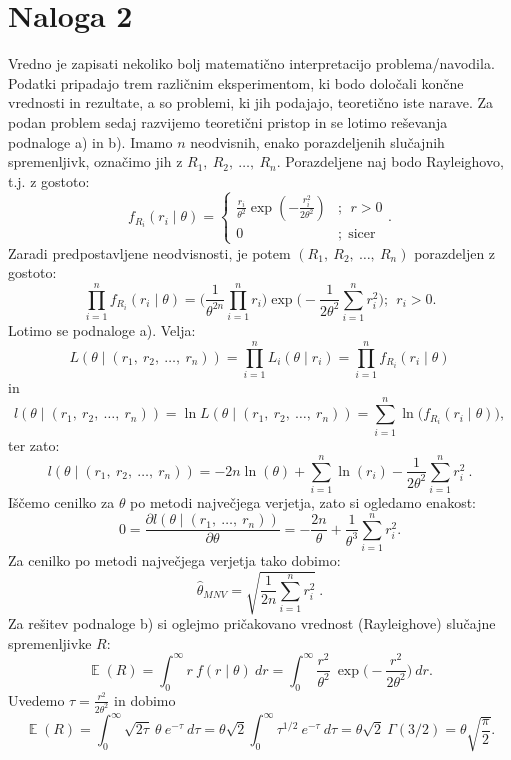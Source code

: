 \documentclass{article}
\DeclareMathOperator{\EX}{\mathbb{E}}
\begin{document}
\section{Naloga 2}
Vredno je zapisati nekoliko bolj matematično interpretacijo problema/navodila. 
Podatki pripadajo trem različnim eksperimentom, ki bodo določali končne vrednosti in rezultate, a so problemi, ki jih podajajo, teoretično iste narave. 
Za podan problem sedaj razvijemo teoretični pristop in se lotimo reševanja podnaloge a) in b). 
\newline
Imamo $n$ neodvisnih, enako porazdeljenih slučajnih spremenljivk, označimo jih z $R_1,~R_2,~\dots,~R_n$. 
Porazdeljene naj bodo Rayleighovo, t.j. z gostoto:
$$
f_{R_i}(r_{i} \mid \theta)=\left\{\begin{array}{cl}
\frac{r_i}{\theta^{2}} \exp \left(-\frac{r_{i}^{2}}{2 \theta^{2}}\right) & ;~~r>0 \\
0 & ;~~\text{sicer }
\end{array}\right. .
$$
Zaradi predpostavljene neodvisnosti, je potem $(R_1,~R_2,~\dots,~R_n)$ porazdeljen z gostoto:
$$
    \prod_{i=1}^{n}{f_{R_i}(r_{i} \mid \theta)} = 
    \bigg(\frac{1}{\theta^{2n}}\prod_{i=1}^{n}{r_i}\bigg) \exp\bigg(-\frac{1}{2 \theta^{2}} \sum_{i=1}^{n}{r_i^2}\bigg);~~r_i>0.
$$
Lotimo se podnaloge a). Velja:
$$
L(\theta \mid (r_1,~r_2,~\dots,~r_n)) = \prod_{i=1}^{n}{L_i(\theta \mid r_i)} = \prod_{i=1}^{n}{f_{R_i}(r_i \mid \theta)}
$$
in
$$
l(\theta \mid (r_1,~r_2,~\dots,~r_n)) = \ln L(\theta \mid (r_1,~r_2,~\dots,~r_n)) = \sum_{i=1}^{n}{\ln \big(f_{R_i}(r_i \mid \theta)\big)}, 
$$
ter zato:
$$
l(\theta \mid (r_1,~r_2,~\dots,~r_n)) = -2n \ln(\theta) + \sum_{i=1}^{n}{\ln(r_i)} - \frac{1}{2\theta^2} \sum_{i=1}^{n}{r_i^2}~.
$$
Iščemo cenilko za $\theta$ po metodi največjega verjetja, zato si ogledamo enakost:
$$
0 = \frac{\partial l(\theta \mid (r_1,~\dots,~r_n))}{\partial \theta} = - \frac{2n}{\theta} + \frac{1}{\theta^3}\sum_{i=1}^{n}{r_i^2}.
$$
Za cenilko po metodi največjega verjetja tako dobimo:
$$
\hat{\theta}_{MNV} = \sqrt{\frac{1}{2n}{\sum_{i=1}^{n}{r_i^2}}}~.
$$
Za rešitev podnaloge b) si oglejmo pričakovano vrednost (Rayleighove) slučajne spremenljivke $R$:
$$
\EX(R) = \int_{0}^{\infty}{r~f(r \mid \theta)~dr}= \int_{0}^{\infty}{\frac{r^2}{\theta^{2}}~\exp\Big(-\frac{r^{2}}{2 \theta^{2}}\Big)~dr}.
$$
Uvedemo $\tau = \frac{r^{2}}{2 \theta^{2}}$ in dobimo
$$
\EX(R) = \int_{0}^{\infty}{\sqrt{2 \tau}~\theta ~e^{-\tau}~ d \tau} = \theta \sqrt{2}\int_{0}^{\infty}{\tau^{1/2}~e^{-\tau}~ d \tau} = \theta\sqrt{2}~\Gamma(3/2) = \theta \sqrt{\frac{\pi}{2}}.
$$
\end{document}
